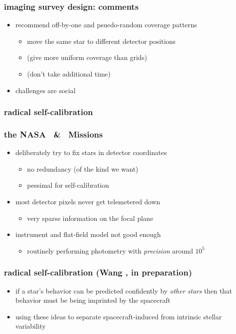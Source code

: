 \documentclass[pdftex]{beamer}
\begin{document}
\begin{frame}
  \frametitle{imaging survey design: comments}
  \begin{itemize}
  \item recommend off-by-one and psuedo-random coverage patterns
    \begin{itemize}
    \item move the same star to different detector positions
    \item (give more uniform coverage than grids)
    \item (don't take additional time)
    \end{itemize}
  \item challenges are social
  \end{itemize}
\end{frame}

\begin{frame}
  \frametitle{radical self-calibration}
\end{frame}

\begin{frame}
  \frametitle{the NASA \kepler\ \& \kt\ Missions}
  \begin{itemize}
  \item deliberately try to fix stars in detector coordinates
    \begin{itemize}
    \item no redundancy (of the kind we want)
    \item pessimal for self-calibration
    \end{itemize}
  \item most detector pixels never get telemetered down
    \begin{itemize}
    \item very sparse information on the focal plane
    \end{itemize}
  \item instrument and flat-field model not good enough
    \begin{itemize}
    \item routinely performing photometry with \emph{precision} around $10^5$
    \end{itemize}
  \end{itemize}
\end{frame}

\begin{frame}
  \frametitle{radical self-calibration {\footnotesize (Wang \etal, in preparation)}}
  \begin{itemize}
  \item if a star's behavior can be predicted confidently by
    \emph{other stars} then that behavior must be being imprinted by
    the spacecraft
  \item using these ideas to separate spacecraft-induced from
    intrinsic stellar variability
  \end{itemize}
\end{frame}
\end{document}
